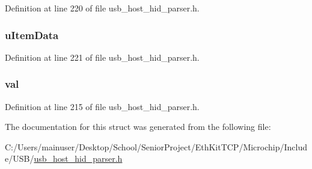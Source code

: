 Definition at line 220 of file usb\+\_\+host\+\_\+hid\+\_\+parser.\+h.

\hypertarget{struct___h_i_d___i_t_e_m___i_n_f_o_af6b89a9709626b8a41077c9fa0a671f0}{}
\subsubsection[{u\+Item\+Data}]{ u\+Item\+Data}\label{struct___h_i_d___i_t_e_m___i_n_f_o_af6b89a9709626b8a41077c9fa0a671f0}


Definition at line 221 of file usb\+\_\+host\+\_\+hid\+\_\+parser.\+h.

\hypertarget{struct___h_i_d___i_t_e_m___i_n_f_o_a5986ea8162aa0f6608b36b20964044dd}{}
\subsubsection[{val}]{ val}\label{struct___h_i_d___i_t_e_m___i_n_f_o_a5986ea8162aa0f6608b36b20964044dd}


Definition at line 215 of file usb\+\_\+host\+\_\+hid\+\_\+parser.\+h.



The documentation for this struct was generated from the following file\+:\begin{DoxyCompactItemize}
\item 
C\+:/\+Users/mainuser/\+Desktop/\+School/\+Senior\+Project/\+Eth\+Kit\+T\+C\+P/\+Microchip/\+Include/\+U\+S\+B/\hyperlink{usb__host__hid__parser_8h}{usb\+\_\+host\+\_\+hid\+\_\+parser.\+h}\end{DoxyCompactItemize}
